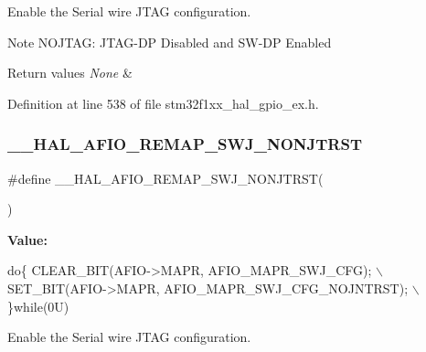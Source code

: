 Enable the Serial wire J\+T\+AG configuration. 

\begin{DoxyNote}{Note}
N\+O\+J\+T\+AG\+: J\+T\+A\+G-\/\+DP Disabled and S\+W-\/\+DP Enabled 
\end{DoxyNote}

\begin{DoxyRetVals}{Return values}
{\em None} & \\
\hline
\end{DoxyRetVals}


Definition at line 538 of file stm32f1xx\+\_\+hal\+\_\+gpio\+\_\+ex.\+h.

\mbox{\label{group___g_p_i_o_ex___a_f_i_o___a_f___r_e_m_a_p_p_i_n_g_ga1febef38fae374565df1b5dfdfd8c906}} 
\subsubsection{\texorpdfstring{\+\_\+\+\_\+\+H\+A\+L\+\_\+\+A\+F\+I\+O\+\_\+\+R\+E\+M\+A\+P\+\_\+\+S\+W\+J\+\_\+\+N\+O\+N\+J\+T\+R\+ST}{\_\_HAL\_AFIO\_REMAP\_SWJ\_NONJTRST}}
{\footnotesize\ttfamily \#define \+\_\+\+\_\+\+H\+A\+L\+\_\+\+A\+F\+I\+O\+\_\+\+R\+E\+M\+A\+P\+\_\+\+S\+W\+J\+\_\+\+N\+O\+N\+J\+T\+R\+ST(\begin{DoxyParamCaption}{ }\end{DoxyParamCaption})}

{\bfseries Value\+:}
\begin{DoxyCode}
\textcolor{keywordflow}{do}\{ CLEAR\_BIT(AFIO->MAPR, AFIO\_MAPR\_SWJ\_CFG);         \(\backslash\)
                                              SET\_BIT(AFIO->MAPR, AFIO\_MAPR\_SWJ\_CFG\_NOJNTRST);  \(\backslash\)
                                            \}\textcolor{keywordflow}{while}(0U)
\end{DoxyCode}


Enable the Serial wire J\+T\+AG configuration. 

